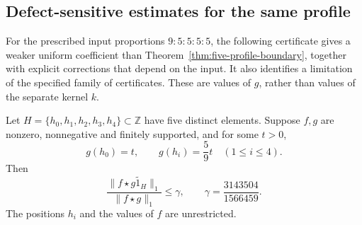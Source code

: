 \subsection{Defect-sensitive estimates for the same profile}
\label{sec:five-site-profile}

For the prescribed input proportions $9:5:5:5:5$, the following
certificate gives a weaker uniform coefficient than
Theorem~\ref{thm:five-profile-boundary}, together with explicit
corrections that depend on the input. It also identifies a limitation
of the specified family of certificates. These are values of $g$,
rather than values of the separate kernel $k$.

\begin{theorem}\label{thm:five-profile-resolvent}
Let $H=\{h_0,h_1,h_2,h_3,h_4\}\subset\mathbb Z$ have five distinct
elements.  Suppose $f,g$ are nonzero, nonnegative and finitely supported,
and for some $t>0$,
\[
 g(h_0)=t,\qquad g(h_i)=\frac59t\quad(1\le i\le4).
\]
Then
\begin{equation}\label{eq:five-profile-bound}
 \frac{\|f\star\widetilde{g1_H}\|_1}{\|f\star g\|_1}
 \le \gamma,\qquad
 \gamma=\frac{3143504}{1566459}.
\end{equation}
The positions $h_i$ and the values of $f$ are unrestricted.
\end{theorem}

